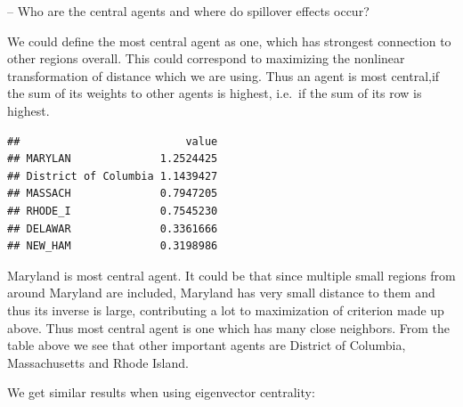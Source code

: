 \documentclass[
  a4paper,
]{article}
\begin{document}
-- Who are the central agents and where do spillover effects occur?

We could define the most central agent as one, which has strongest
connection to other regions overall. This could correspond to maximizing
the nonlinear transformation of distance which we are using. Thus an
agent is most central,if the sum of its weights to other agents is
highest, i.e.~if the sum of its row is highest.

\begin{verbatim}
##                          value
## MARYLAN              1.2524425
## District of Columbia 1.1439427
## MASSACH              0.7947205
## RHODE_I              0.7545230
## DELAWAR              0.3361666
## NEW_HAM              0.3198986
\end{verbatim}

Maryland is most central agent. It could be that since multiple small
regions from around Maryland are included, Maryland has very small
distance to them and thus its inverse is large, contributing a lot to
maximization of criterion made up above. Thus most central agent is one
which has many close neighbors. From the table above we see that other
important agents are District of Columbia, Massachusetts and Rhode
Island.

We get similar results when using eigenvector centrality:
\end{document}
